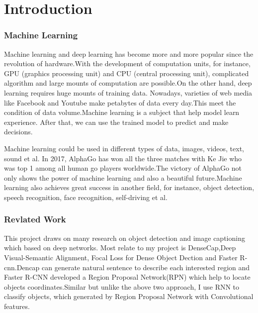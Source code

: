 \documentclass[12pt,a4paper]{report}
\begin{document}
\newpage

\tableofcontents
\newpage


\begin{appendix}
  \listoffigures

\end{appendix}

\newpage

\begin{appendix}
  \listoftables
\end{appendix}

\newpage
{}
\section{Introduction}
\subsubsection{Machine Learning}
Machine learning and deep learning has become more and more popular since the revolution of hardware.With the development of computation units, for instance, GPU (graphics processing unit) and CPU (central processing unit), complicated algorithm and large mounts of computation are possible.On the other hand, deep learning requires huge mounts of training data. Nowadays, varieties of web media like Facebook and Youtube make petabytes of data every day.This meet the condition of data volume.Machine learning is a subject that help model learn experience. After that, we can use the trained model to predict and make decisions.

Machine learning could be used in different types of data, images, videos, text, sound et al. In 2017, AlphaGo has won all the three matches with Ke Jie who was top 1 among all human go players worldwide.The victory of AlphaGo not only shows the power of machine learning and also a beautiful future.Machine learning also achieves great success in another field, for instance, object detection, speech recognition, face recognition, self-driving et al.
\subsubsection{Revlated Work}
This project draws on many research on object detection\cite{ob} and image captioning which based on deep networks.
Most relate to my project is DenseCap\cite{densecap},Deep Visual-Semantic Alignment\cite{deepvisual}, Focal Loss for Dense Object Dection\cite{focalloss} and Faster R-cnn\cite{frcnn}.Dencap can generate natural sentence to describe each interested region and Faster R-CNN developed a Region Proposal Network(RPN) which help to locate objects coordinates.Similar but unlike the above two approach, I use RNN to classify objects, which generated by Region Proposal Network with Convolutional features.
\newpage
\end{document}
